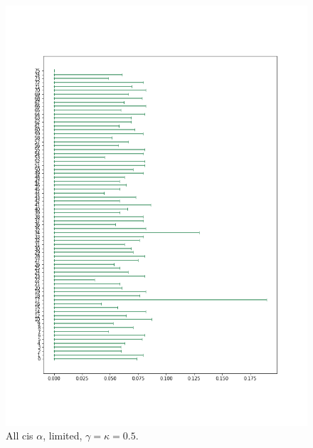\begin{figure}
    \centering
    \includegraphics[scale=0.48]{pictures/Gamma=kappa=0.5/all_cis_alpha_lim.png}
    \caption{All cis $\alpha$, limited, $\gamma=\kappa=0.5$.}
    \label{fig:all_cis_alpha_lim_gk0.5}
\end{figure}

